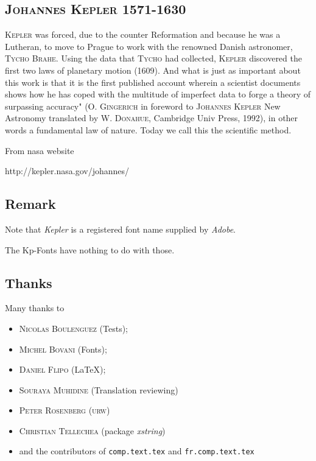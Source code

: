\documentclass[a4paper,11pt]{article}
\begin{document}
\subsection{\textsc{Johannes Kepler 1571-1630}}

    \textsc{Kepler} was forced, due to the counter Reformation and because he was a Lutheran, to move to Prague to work with the renowned Danish astronomer, \textsc{Tycho Brahe}. Using the data that \textsc{Tycho} had collected, \textsc{Kepler} discovered the first two laws of planetary motion (1609). And what is just as important about this work is that it is the first published account wherein a scientist documents shows how he has coped with the multitude of imperfect data to forge a theory of surpassing accuracy" (\textsc{O. Gingerich} in foreword to \textsc{Johannes Kepler} New Astronomy translated by \textsc{W. Donahue}, Cambridge Univ Press, 1992), in other words a fundamental law of nature. Today we call this the scientific method.

From nasa website

http://kepler.nasa.gov/johannes/

\subsection{Remark}

Note that \textit{Kepler}\textregistered{} is a registered font name supplied by \textit{Adobe}\texttrademark. 

The Kp-Fonts have nothing to do with those.

\subsection{Thanks}

Many thanks to
\begin{itemize}
	\item \textsc{Nicolas Boulenguez} (Tests);
	\item \textsc{Michel Bovani} (Fonts);
	\item \textsc{Daniel Flipo} (\LaTeX);
	\item \textsc{Souraya Muhidine} (Translation reviewing)
	\item \textsc{Peter Rosenberg} (\textsc{urw})
	\item \textsc{Christian Tellechea} (package \textit{xstring})
	\item and the contributors of \texttt{comp.text.tex} and \texttt{fr.comp.text.tex}
	\end{itemize}
	
\end{document}
